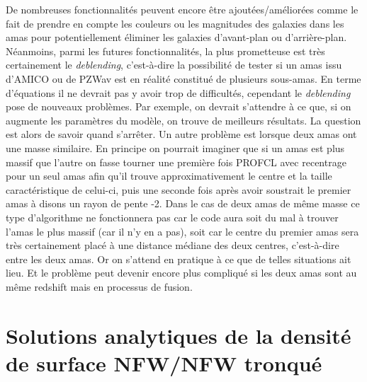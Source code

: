 \documentclass[a4paper,11pt]{article}
\numberwithin{equation}{section}
\begin{document}
     De nombreuses fonctionnalités peuvent encore être ajoutées/améliorées comme le fait de prendre en compte les couleurs ou les magnitudes des galaxies dans les amas pour potentiellement éliminer les galaxies d'avant-plan ou d'arrière-plan. Néanmoins, parmi les futures fonctionnalités, la plus prometteuse est très certainement le \textit{deblending}, c'est-à-dire la possibilité de tester si un amas issu d'AMICO ou de PZWav est en réalité constitué de plusieurs sous-amas. En terme d'équations il ne devrait pas y avoir trop de difficultés, cependant le \textit{deblending} pose de nouveaux problèmes. Par exemple, on devrait s'attendre à ce que, si on augmente les paramètres du modèle, on trouve de meilleurs résultats. La question est alors de savoir quand s'arrêter. Un autre problème est lorsque deux amas ont une masse similaire. En principe on pourrait imaginer que si un amas est plus massif que l'autre on fasse tourner une première fois PROFCL avec recentrage pour un seul amas afin qu'il trouve approximativement le centre et la taille caractéristique de celui-ci, puis une seconde fois après avoir soustrait le premier amas à disons un rayon de pente -2. Dans le cas de deux amas de même masse ce type d'algorithme ne fonctionnera pas car le code aura soit du mal à trouver l'amas le plus massif (car il n'y en a pas), soit car le centre du premier amas sera très certainement placé à une distance médiane des deux centres, c'est-à-dire entre les deux amas. Or on s'attend en pratique à ce que de telles situations ait lieu. Et le problème peut devenir encore plus compliqué si les deux amas sont au même redshift mais en processus de fusion. 



\newpage



\newpage
\appendix
\section{Solutions analytiques de la densité de surface NFW/NFW tronqué}
\label{Solutions analytiques de la densité de surface NFW/NFW tronqué}
\end{document}
